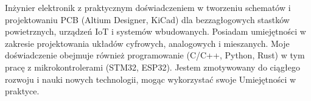 
Inżynier elektronik z praktycznym doświadczeniem w tworzeniu schematów i projektowaniu PCB (Altium Designer, KiCad) dla bezzagłogowych stastków powietrznych, urządzeń IoT i systemów wbudowanych. Posiadam umiejętności w zakresie projektowania układów cyfrowych, analogowych i mieszanych. Moje doświadczenie obejmuje również programowanie (C/C++, Python, Rust) w tym pracę z mikrokontrolerami (STM32, ESP32). Jestem zmotywowany do ciągłego rozwoju i nauki nowych technologii, mogąc wykorzystać swoje Umiejętności w praktyce.

